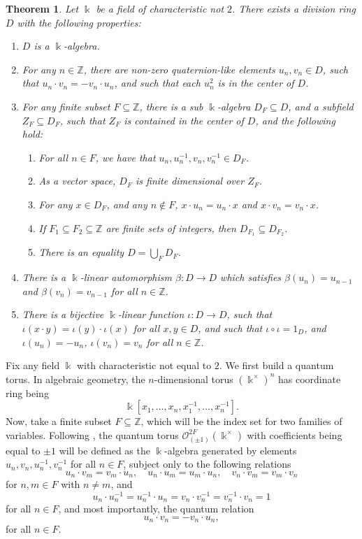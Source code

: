 \documentclass{amsart}
\newtheorem{thm}[equation]{Theorem}
\theoremstyle{definition}
\renewcommand{\k}{\Bbbk}
\numberwithin{equation}{section}
\begin{document}
\begin{thm}\label{thm:divisionRing}
Let $\k$ be a field of characteristic not $2$.
There exists a division ring $D$ with the following properties:
\begin{enumerate}
\item $D$ is a $\k$-algebra.
\item For any $n \in \mathbb{Z}$,
there are non-zero quaternion-like elements $u_n, v_n \in D$,
such that $u_n\cdot v_n = -v_n\cdot u_n$,
and such that each $u_n^2$ is in the center of $D$.
\item For any finite subset $F \subseteq \mathbb{Z}$,
there is a sub $\k$-algebra $D_F \subseteq D$,
and a subfield $Z_F \subseteq D_F$,
such that $Z_F$ is contained in the center of $D$, and the following hold:
\begin{enumerate}
\item For all $n \in F$, we have that $u_n, u_n^{-1}, v_n, v_n^{-1} \in D_F$.
\item As a vector space, $D_F$ is finite dimensional over $Z_F$.
\item For any $x \in D_F$, and any $n \notin F$, $x\cdot u_n = u_n \cdot x$ and $x\cdot v_n = v_n \cdot x$.
\item If $F_1 \subseteq F_2 \subseteq \mathbb{Z}$ are finite sets of integers,
then $D_{F_1} \subseteq D_{F_2}$.
\item There is an equality $D = \bigcup_F D_F$.
\end{enumerate}
\item There is a $\k$-linear automorphism $\beta:D \to D$ which satisfies $\beta(u_n) = u_{n-1}$ and $\beta(v_n) = v_{n-1}$ for all $n \in \mathbb{Z}$.
\item There is a bijective $\k$-linear function $\iota:D \to D$,
such that $\iota(x\cdot y) = \iota(y)\cdot \iota(x)$ for all $x,y \in D$,
and such that $\iota\circ \iota = 1_D$, and $\iota(u_n) = -u_n$, $\iota(v_n) = v_n$ for all $n \in \mathbb{Z}$.
\end{enumerate} 
\end{thm}

Fix any field $\k$ with characteristic not equal to $2$.
We first build a quantum torus.
In algebraic geometry, the $n$-dimensional torus $(\k^\times)^n$ has  coordinate ring being 
\[
\k[x_1,\dots,x_n,x_1^{-1},\dots,x_n^{-1}].
\]
Now, take a finite subset $F \subseteq \mathbb{Z}$,
which will be the index set for two families of variables.
Following \cite[Example 1.5.10(ii)]{NCBook},
the quantum torus $\mathcal{O}^{2F}_{(\pm 1)}(\k^{\times})$ with coefficients being equal to $\pm 1$ will be defined as the $\k$-algebra generated by elements $u_n ,v_n, u^{-1}_n, v^{-1}_n$ for all $n\in F$,
subject only to the following relations 
\[
u_n \cdot v_m = v_m \cdot u_n, \quad u_n \cdot u_m = u_m \cdot u_n, \quad v_n \cdot v_m = v_m \cdot v_n
\]
for $n,m \in F$ with $n \ne m$, and
\[
u_n \cdot u_n^{-1} = u_n^{-1} \cdot u_n = v_n\cdot v_n^{-1} = v_n^{-1} \cdot v_n = 1
\]
for all $n \in F$,
and most importantly, the quantum relation
\begin{equation}\label{eqn:quantum}
u_n \cdot v_n = -v_n\cdot u_n,
\end{equation}
for all $n \in F$.
\end{document}
